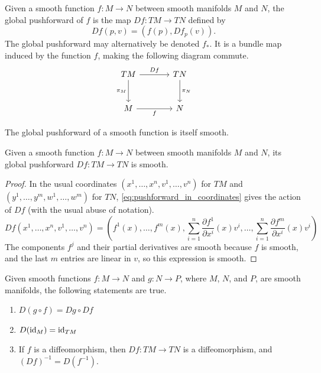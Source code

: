 \documentclass[a4paper,12pt]{article}
\begin{document}
\begin{definition}\label{def:global_pushforward}
    Given a smooth function $f \colon M \to N$ between smooth manifolds $M$ and $N$, the global pushforward of $f$ is the map $Df \colon TM \to TN$ defined by
    \begin{equation}
        Df(p, v) = (f(p), Df_p(v)).
    \end{equation}
    The global pushforward may alternatively be denoted $f_*$.
    It is a bundle map induced by the function $f$, making the following diagram commute.
    \[\begin{tikzcd}[sep=large]
        TM & TN \\
        M & N
        \arrow["Df", from=1-1, to=1-2]
        \arrow["{\pi_M}"', from=1-1, to=2-1]
        \arrow["{\pi_N}", from=1-2, to=2-2]
        \arrow["f"', from=2-1, to=2-2]
    \end{tikzcd}\]
\end{definition}
The global pushforward of a smooth function is itself smooth.
\begin{proposition}\label{prop:global_pushforward_is_smooth}
    Given a smooth function $f \colon M \to N$ between smooth manifolds $M$ and $N$, its global pushforward $Df \colon TM \to TN$ is smooth.
\end{proposition}
\begin{proof}
    In the usual coordinates $(x^1, \ldots, x^n, v^1, \ldots, v^n)$ for $TM$ and $(y^1, \ldots, y^m, w^1, \ldots, w^m)$ for $TN$, \eqref{eq:pushforward_in_coordinates} gives the action of $Df$ (with the usual abuse of notation).
    \begin{equation}
        Df(x^1, \ldots, x^n, v^1, \ldots, v^n) = \left(f^1(x), \ldots, f^m(x), \sum_{i=1}^n \frac{\partial f^1}{\partial x^i}(x) v^i, \ldots, \sum_{i=1}^n \frac{\partial f^m}{\partial x^i}(x) v^i\right)
    \end{equation}
    The components $f^j$ and their partial derivatives are smooth because $f$ is smooth, and the last $m$ entries are linear in $v$, so this expression is smooth.
\end{proof}
\begin{corollary}\label{cor:global_pushforward_properties}
    Given smooth functions $f \colon M \to N$ and $g \colon N \to P$, where $M$, $N$, and $P$, are smooth manifolds, the following statements are true.
    \begin{enumerate}
        \item $D(g \circ f) = Dg \circ Df$
        \item $D(\operatorname{id}_M) = \operatorname{id}_{TM}$
        \item If $f$ is a diffeomorphism, then $Df \colon TM \to TN$ is a diffeomorphism, and $(Df)^{-1} = D(f^{-1})$.
    \end{enumerate}
\end{corollary}
\end{document}
